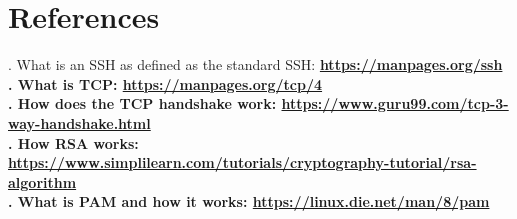 \documentclass{article}
\begin{document}
    \section{References}
    . What is an SSH as defined as the standard SSH: \bf\href{https://manpages.org/ssh}{https://manpages.org/ssh} \\
    . What is TCP: \bf\href{https://manpages.org/tcp/4}{https://manpages.org/tcp/4} \\
    . How does the TCP handshake work:  \bf\href{https://www.guru99.com/tcp-3-way-handshake.html}{https://www.guru99.com/tcp-3-way-handshake.html} \\
    . How RSA works: \bf\href{https://www.simplilearn.com/tutorials/cryptography-tutorial/rsa-algorithm}{https://www.simplilearn.com/tutorials/cryptography-tutorial/rsa-algorithm} \\
    . What is PAM and how it works: \bf\href{https://linux.die.net/man/8/pam}{https://linux.die.net/man/8/pam} \\
\end{document}
